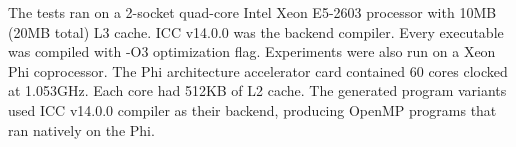 The tests ran on a 2-socket quad-core Intel Xeon E5-2603 processor with 10MB (20MB total) L3 cache.
ICC v14.0.0 was the backend compiler. Every executable was compiled with -O3 optimization flag. 
Experiments were also run on a Xeon Phi coprocessor. 
The Phi architecture accelerator card contained 60 cores clocked at 1.053GHz. Each core had 512KB of L2 cache. 
The generated program variants used ICC v14.0.0 compiler as their backend, producing OpenMP programs that ran natively on the Phi.
